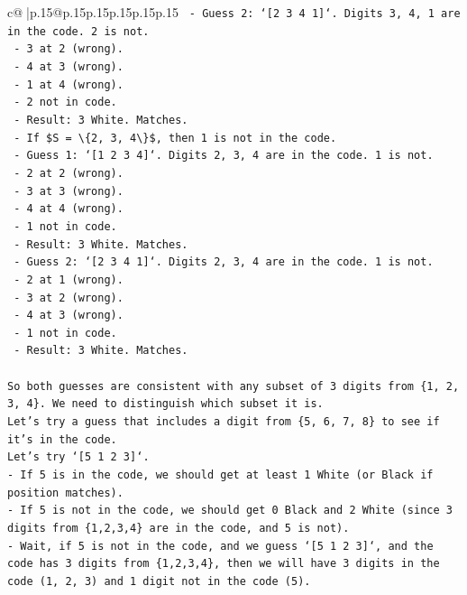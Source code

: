 \documentclass{article}
\begin{document}
{\begin{supertabular}{c@{$\;$}|p{.15\linewidth}@{}p{.15\linewidth}p{.15\linewidth}p{.15\linewidth}p{.15\linewidth}p{.15\linewidth}}
{{{\texttt{    {-} Guess 2: `{[}2 3 4 1{]}`. Digits 3, 4, 1 are in the code. 2 is not.} \\
\texttt{      {-} 3 at 2 (wrong).} \\
\texttt{      {-} 4 at 3 (wrong).} \\
\texttt{      {-} 1 at 4 (wrong).} \\
\texttt{      {-} 2 not in code.} \\
\texttt{      {-} Result: 3 White. Matches.} \\
\texttt{  {-} If \$S = \textbackslash{}\{2, 3, 4\textbackslash{}\}\$, then 1 is not in the code.} \\
\texttt{    {-} Guess 1: `{[}1 2 3 4{]}`. Digits 2, 3, 4 are in the code. 1 is not.} \\
\texttt{      {-} 2 at 2 (wrong).} \\
\texttt{      {-} 3 at 3 (wrong).} \\
\texttt{      {-} 4 at 4 (wrong).} \\
\texttt{      {-} 1 not in code.} \\
\texttt{      {-} Result: 3 White. Matches.} \\
\texttt{    {-} Guess 2: `{[}2 3 4 1{]}`. Digits 2, 3, 4 are in the code. 1 is not.} \\
\texttt{      {-} 2 at 1 (wrong).} \\
\texttt{      {-} 3 at 2 (wrong).} \\
\texttt{      {-} 4 at 3 (wrong).} \\
\texttt{      {-} 1 not in code.} \\
\texttt{      {-} Result: 3 White. Matches.} \\
\\ 
\texttt{So both guesses are consistent with any subset of 3 digits from \{1, 2, 3, 4\}. We need to distinguish which subset it is.} \\
\texttt{Let's try a guess that includes a digit from \{5, 6, 7, 8\} to see if it's in the code.} \\
\texttt{Let's try `{[}5 1 2 3{]}`.} \\
\texttt{{-} If 5 is in the code, we should get at least 1 White (or Black if position matches).} \\
\texttt{{-} If 5 is not in the code, we should get 0 Black and 2 White (since 3 digits from \{1,2,3,4\} are in the code, and 5 is not).} \\
\texttt{{-} Wait, if 5 is not in the code, and we guess `{[}5 1 2 3{]}`, and the code has 3 digits from \{1,2,3,4\}, then we will have 3 digits in the code (1, 2, 3) and 1 digit not in the code (5).} \\
}}}
\end{supertabular}}
\end{document}
